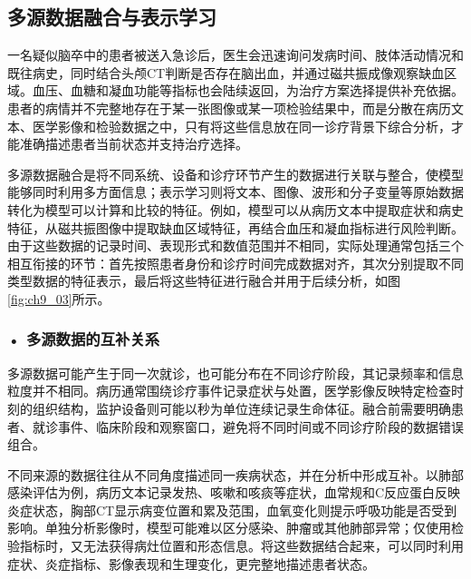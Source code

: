 \subsection{多源数据融合与表示学习}

一名疑似脑卒中的患者被送入急诊后，医生会迅速询问发病时间、肢体活动情况和既往病史，同时结合头颅CT判断是否存在脑出血，并通过磁共振成像观察缺血区域。血压、血糖和凝血功能等指标也会陆续返回，为治疗方案选择提供补充依据。患者的病情并不完整地存在于某一张图像或某一项检验结果中，而是分散在病历文本、医学影像和检验数据之中，只有将这些信息放在同一诊疗背景下综合分析，才能准确描述患者当前状态并支持治疗选择。

多源数据融合是将不同系统、设备和诊疗环节产生的数据进行关联与整合，使模型能够同时利用多方面信息；表示学习则将文本、图像、波形和分子变量等原始数据转化为模型可以计算和比较的特征。例如，模型可以从病历文本中提取症状和病史特征，从磁共振图像中提取缺血区域特征，再结合血压和凝血指标进行风险判断。由于这些数据的记录时间、表现形式和数值范围并不相同，实际处理通常包括三个相互衔接的环节：首先按照患者身份和诊疗时间完成数据对齐，其次分别提取不同类型数据的特征表示，最后将这些特征进行融合并用于后续分析，如图\ref{fig:ch9_03}所示。

\par
\noindent\begin{minipage}{\textwidth}
\centering
{}
\label{fig:ch9_03}
\end{minipage}
\par

\subsubsection*{\textbf{• 多源数据的互补关系}}
多源数据可能产生于同一次就诊，也可能分布在不同诊疗阶段，其记录频率和信息粒度并不相同。病历通常围绕诊疗事件记录症状与处置，医学影像反映特定检查时刻的组织结构，监护设备则可能以秒为单位连续记录生命体征。融合前需要明确患者、就诊事件、临床阶段和观察窗口，避免将不同时间或不同诊疗阶段的数据错误组合。

不同来源的数据往往从不同角度描述同一疾病状态，并在分析中形成互补。以肺部感染评估为例，病历文本记录发热、咳嗽和咳痰等症状，血常规和C反应蛋白反映炎症状态，胸部CT显示病变位置和累及范围，血氧变化则提示呼吸功能是否受到影响。单独分析影像时，模型可能难以区分感染、肿瘤或其他肺部异常；仅使用检验指标时，又无法获得病灶位置和形态信息。将这些数据结合起来，可以同时利用症状、炎症指标、影像表现和生理变化，更完整地描述患者状态。

